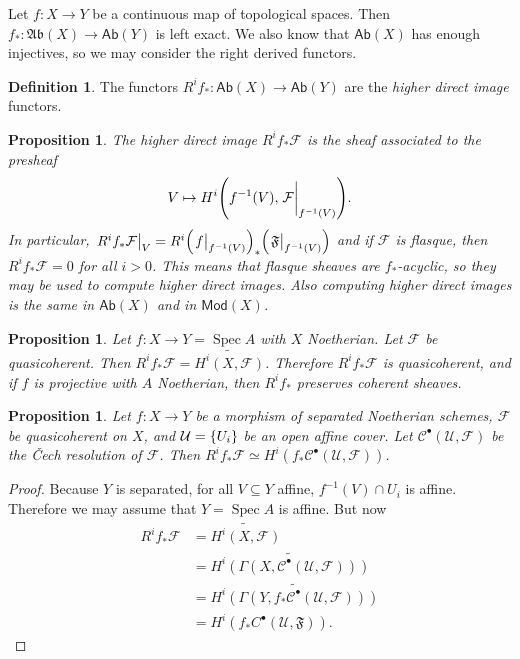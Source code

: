 \documentclass[leqno, openany]{memoir}
\newtheorem{prop}[thm]{Proposition}
\theoremstyle{definition}
\newtheorem{defn}[thm]{Definition}
\theoremstyle{remark}
\theoremstyle{plain}
\theoremstyle{definition}
\theoremstyle{remark}
\newcommand{\mc}[1]{\mathcal{#1}}
\newcommand{\mf}[1]{\mathfrak{#1}}
\newcommand{\ms}[1]{\mathsf{#1}}
\newcommand{\wt}[1]{\widetilde{#1}}
\DeclareMathOperator{\Spec}{Spec}
\begin{document}
Let $f \colon X \to Y$ be a continuous map of topological spaces. Then $f_*
\colon \mf{Ab}(X) \to \ms{Ab}(Y)$ is left exact. We also know that $\ms{Ab}(X)$
has enough injectives, so we may consider the right derived functors.

\begin{defn} The functors $R^i f_* \colon \ms{Ab}(X) \to \ms{Ab}(Y)$ are the
\textit{higher direct image} functors.  \end{defn}

\begin{prop} The higher direct image $R^i f_* \mc{F}$ is the sheaf associated
    to the presheaf \[ V \mapsto H^i\qty(f^{-1}(V), \eval{\mc{F}}_{f^{-1}(V)}).
    \] In particular, $\eval{R^i f_* \mc{F}}_V = R^i
    {\qty(\eval{f}_{f^{-1}(V)})}_* \qty(\eval{\mf{F}}_{f^{-1}(V)})$ and if
    $\mc{F}$ is flasque, then $R^i f_* \mc{F} = 0$ for all $i > 0$. This means
    that flasque sheaves are $f_*$-acyclic, so they may be used to compute
    higher direct images. Also computing higher direct images is the same in
    $\ms{Ab}(X)$ and in $\ms{Mod}(X)$.  \end{prop}

\begin{prop} Let $f \colon X \to Y = \Spec A$ with $X$ Noetherian. Let $\mc{F}$
    be quasicoherent. Then $R^i f_* \mc{F} = \wt{H^i(X, \mc{F})}$. Therefore
    $R^i f_* \mc{F}$ is quasicoherent, and if $f$ is projective with $A$
    Noetherian, then $R^i f_*$ preserves coherent sheaves.  \end{prop}

\begin{prop} Let $f \colon X \to Y$ be a morphism of separated Noetherian
    schemes, $\mc{F}$ be quasicoherent on $X$, and $\mc{U} = \qty{U_i}$ be an
    open affine cover. Let $\mc{C}^{\bullet}(\mc{U}, \mc{F})$ be the \v{C}ech
    resolution of $\mc{F}$. Then $R^i f_* \mc{F} \simeq H^i(f_*
    \mc{C}^{\bullet}(\mc{U}, \mc{F}))$.  \end{prop}

\begin{proof} Because $Y$ is separated, for all $V \subseteq Y$ affine,
    $f^{-1}(V) \cap U_i$ is affine. Therefore we may assume that $Y = \Spec A$
    is affine. But now \begin{align*} R^i f_* \mc{F} &= \wt{H^i(X, \mc{F})} \\
    &= \wt{H^i(\Gamma(X, \mc{C}^{\bullet}(\mc{U}, \mc{F})))} \\ &=
    \wt{H^i(\Gamma(Y, f_* \mc{C}^{\bullet}(\mc{U}, \mc{F})))} \\ &= H^i(f_*
C^{\bullet}(\mc{U}, \mf{F})).  \end{align*} \end{proof}
\end{document}
